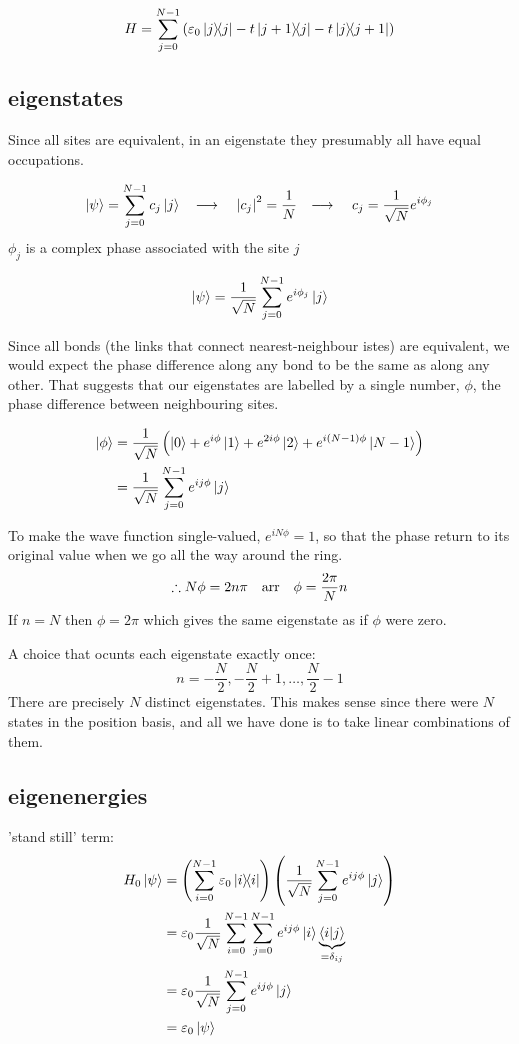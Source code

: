 \documentclass[10pt, a4paper, twocolumn]{article}
\newcommand{\arr}{\ensuremath{\longrightarrow\ }}
\newcommand{\eps}{\ensuremath{\varepsilon _0}}
\begin{document}
\[ H = \sum _{j=0}^{N-1}
\left(
\eps \dyad{j} - t \dyad{j+1}{j} - t \dyad{j}{j+1}
\right) \]

\subsection{eigenstates}

Since all sites are equivalent, in an eigenstate they presumably all have equal occupations.

\[ \ket \psi = \sum _{j=0}^{N-1} c_j \ket j
\qq{\arr} \abs{c_j}^2 = \frac1N
\qq{\arr} c_j = \frac{1}{\sqrt N}e^{i\phi _j} \]
$\phi _j$ is a complex phase associated with the site $j$

\[ \ket \psi = \frac{1}{\sqrt N}
\sum _{j=0}^{N-1} e^{i \phi _j} \ket j \]

Since all bonds (the links that connect nearest-neighbour istes) are equivalent, we would expect the phase difference along any bond to be the same as along any other. That suggests that our eigenstates are labelled by a single number, $\phi$, the phase difference between neighbouring sites.

\begin{equation*}
\begin{aligned}
\ket \phi &= \frac{1}{\sqrt N}
\left( \ket 0 + e^{i\phi} \ket 1 + e^{2i \phi} \ket 2
+ e^{i(N-1)\phi} \ket{N-1} \right)
\\ &= \frac{1}{\sqrt N} \sum _{j=0}^{N-1} e^{ij\phi} \ket j
\end{aligned}
\end{equation*}

To make the wave function single-valued, $e^{iN\phi}=1$, so that the phase return to its original value when we go all the way around the ring.
\[\therefore N\phi = 2n\pi \qq{arr} \phi = \frac{2\pi}{N}n
\]
If $n=N$ then $\phi = 2\pi$ which gives the same eigenstate as if $\phi$ were zero.

A choice that ocunts each eigenstate exactly once:
\[ n =
-\frac{N}{2}, -\frac{N}{2} +1, \ldots, \frac{N}{2} -1\]
There are precisely $N$ distinct eigenstates. This makes sense since there were $N$ states in the position basis, and all we have done is to take linear combinations of them.

\subsection{eigenenergies}
'stand still' term:
\begin{equation*}
\begin{aligned}
H_0\ket\psi &=
\left( \sum _{i=0}^{N-1} \eps\dyad{i} \right)
\left(\frac{1}{\sqrt N}
\sum _{j=0}^{N-1} e^{ij\phi} \ket j \right)
\\ &= \eps \frac{1}{\sqrt N}
\sum _{i=0}^{N-1} \sum _{j=0}^{N-1} e^{ij\phi} \ket i
\underbrace{\ip{i}{j}}_{=\delta _{ij}}
\\ &= \eps \frac{1}{\sqrt N} \sum _{j=0}^{N-1}
e^{ij\phi} \ket j
\\ &= \eps \ket \psi
\end{aligned}
\end{equation*}
\end{document}
